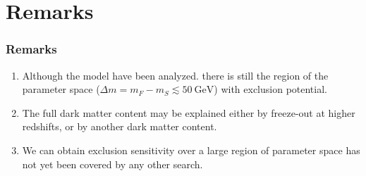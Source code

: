 \documentclass{beamer}
\begin{document}
\section{Remarks}
\begin{frame}
\frametitle{Remarks}

\begin{exampleblock}{}
	
	\begin{enumerate}

		\item Although the model have been analyzed. there is still the region of the parameter space ($\Delta m=m_{F}-m_S\lesssim 50\ \text{GeV}$) with exclusion potential.
		\item The full dark matter content may be explained either by freeze-out at higher redshifts, or by another dark matter content.
		\item  We can obtain exclusion sensitivity over a large region of parameter space has not yet been covered by any other search.
	\end{enumerate}

\end{exampleblock}

\end{frame}




\ThankYouFrame


\end{document}
